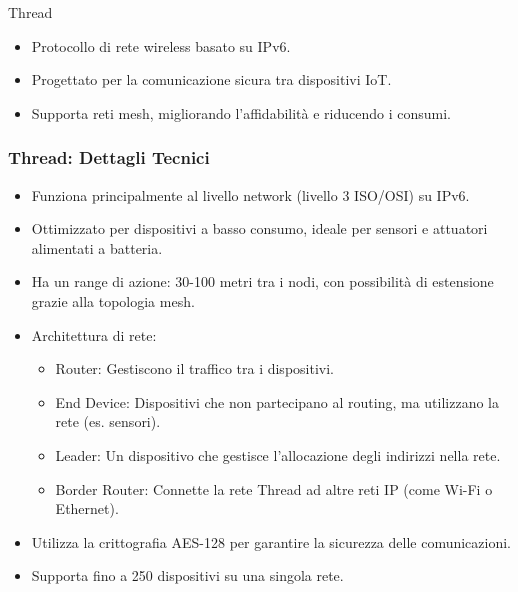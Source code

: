 \documentclass{beamer}
\begin{document}
	\begin{frame}{Thread}
		\begin{itemize}
			\item Protocollo di rete wireless basato su IPv6.
			\item Progettato per la comunicazione sicura tra dispositivi IoT.
			\item Supporta reti mesh, migliorando l'affidabilità e riducendo i consumi.
		\end{itemize}
	\end{frame}
	
\begin{frame}
	\frametitle{Thread: Dettagli Tecnici}
	\begin{itemize}
		\item Funziona principalmente al livello network (livello 3 ISO/OSI) su IPv6.
		\item Ottimizzato per dispositivi a basso consumo, ideale per sensori e attuatori alimentati a batteria.
		\item Ha un range di azione: 30-100 metri tra i nodi, con possibilità di estensione grazie alla topologia mesh.
		\item Architettura di rete:
		\begin{itemize}
			\item Router: Gestiscono il traffico tra i dispositivi.
			\item End Device: Dispositivi che non partecipano al routing, ma utilizzano la rete (es. sensori).
			\item Leader: Un dispositivo che gestisce l'allocazione degli indirizzi nella rete.
			\item Border Router: Connette la rete Thread ad altre reti IP (come Wi-Fi o Ethernet).
		\end{itemize}
		\item Utilizza la crittografia AES-128 per garantire la sicurezza delle comunicazioni.
		\item Supporta fino a 250 dispositivi su una singola rete.
	\end{itemize}
\end{frame}

\end{document}
